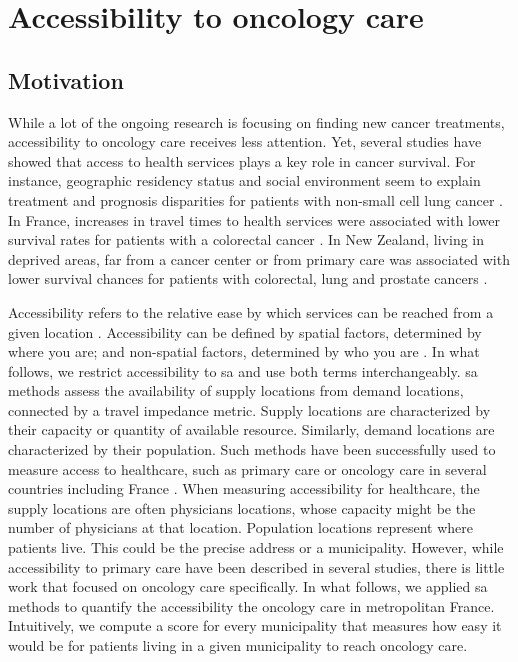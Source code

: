 \chapter{Accessibility to oncology care}

\section{Motivation}

While a lot of the ongoing research is focusing on finding new cancer
treatments, accessibility to oncology care receives less attention. Yet, several
studies have showed that access to health services plays a key role in cancer
survival. For instance, geographic residency status and social environment seem
to explain treatment and prognosis disparities for patients with non-small cell
lung cancer \cite{johnson_treatment_2014}. In France, increases in travel times
to health services were associated with lower survival rates for patients with a
colorectal cancer \cite{dejardin_influence_2014}. In New Zealand, living in
deprived areas, far from a cancer center or from primary care was associated
with lower survival chances for patients with colorectal, lung and prostate
cancers \cite{haynes_cancer_2008}.

Accessibility refers to the relative ease by which services can be reached from
a given location \cite{wang_measurement_2012}. Accessibility can be defined by
spatial factors, determined by where you are; and non-spatial factors,
determined by who you are \cite{khan_integrated_1992}. In what follows, we
restrict accessibility to \acf{sa} and use both terms interchangeably. \ac{sa}
methods assess the availability of supply locations from demand locations,
connected by a travel impedance metric. Supply locations are characterized by
their capacity or quantity of available resource. Similarly, demand locations
are characterized by their population. Such methods have been successfully used
to measure access to healthcare, such as primary care
\cite{guagliardo_spatial_2004} or oncology care
\cite{wang_measurement_2012,zahnd_spatial_2021,alahmadi_spatial_2013} in several
countries including France
\cite{launay_methodology_2019,gusmano_disparities_2014,gao_assessment_2016}.
When measuring accessibility for healthcare, the supply locations are often
physicians locations, whose capacity might be the number of physicians at that
location. Population locations represent where patients live. This could be
the precise address or a municipality. However, while accessibility to primary
care have been described in several studies, there is little work that focused
on oncology care specifically. In what follows, we applied \ac{sa} methods to
quantify the accessibility the oncology care in metropolitan France.
Intuitively, we compute a score for every municipality that measures how easy
it would be for patients living in a given municipality to reach oncology care.

